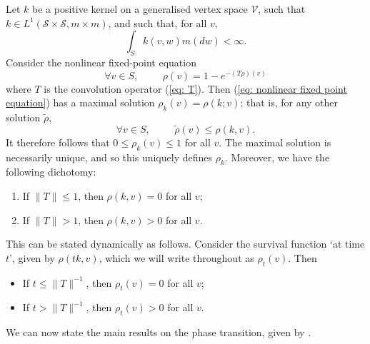    \begin{lemma}\label{lemma: survival function}
       Let $k$ be a positive kernel on a generalised vertex space $\mathcal{V}$, such that $k \in L^1(\mathcal{S}\times \mathcal{S}, m \times m)$, and such that, for all $v,$ \begin{equation} \label{eq: BJR 51}
           \int_S k(v,w)m(dw)<\infty.
       \end{equation} Consider the nonlinear fixed-point equation 
      \begin{equation} \label{eq: nonlinear fixed point equation} 
        \forall v \in S,\hspace{1cm}  {\rho}(v)=1-e^{-(T{\rho})(v)}
      \end{equation} where $T$ is the convolution operator (\ref{eq: T}). Then (\ref{eq: nonlinear fixed point equation}) has a maximal solution $\rho_k(v)=\rho(k;v)$; that is, for any other solution $\tilde{\rho}$, \begin{equation}
          \forall v \in S, \hspace{1cm} \tilde{\rho}(v)\leq \rho(k,v).
      \end{equation} It therefore follows that $0\leq \rho_k(v)\leq 1$ for all $v$. The maximal solution is necessarily unique, and so this uniquely defines $\rho_k.$ Moreover, we have the following dichotomy:
      \begin{enumerate}[label=\roman{*}).]
          \item If $\|T\|\leq 1$, then $\rho(k, v)=0$ for all $v$;
          \item If $\|T\|> 1$, then $\rho(k, v)>0$ for all $v$.
      \end{enumerate} This can be stated dynamically as follows. Consider the survival function `at time $t$', given by $\rho(tk,v)$, which we will write throughout as $\rho_t(v)$. Then 
      \begin{itemize}
          \item If $t\leq \|T\|^{-1}$, then $\rho_t(v)=0$ for all $v$;
          \item If $t>\|T\|^{-1}$, then $\rho_t(v)>0$ for all $v$.
      \end{itemize}
      
   \end{lemma} We can now state the main results on the phase transition, given by \cite[Theorem 3.1 and Corollary 3.2]{BJR07}.
